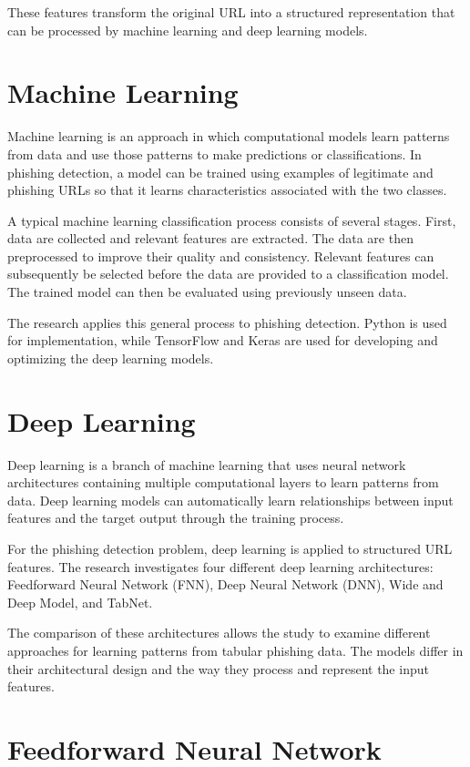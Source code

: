 \documentclass[12pt,a4paper]{report}
\begin{document}
These features transform the original URL into a structured
representation that can be processed by machine learning and deep
learning models.

\section{Machine Learning}

Machine learning is an approach in which computational models learn
patterns from data and use those patterns to make predictions or
classifications. In phishing detection, a model can be trained using
examples of legitimate and phishing URLs so that it learns
characteristics associated with the two classes.

A typical machine learning classification process consists of
several stages. First, data are collected and relevant features are
extracted. The data are then preprocessed to improve their quality
and consistency. Relevant features can subsequently be selected
before the data are provided to a classification model. The trained
model can then be evaluated using previously unseen data.

The research applies this general process to phishing detection.
Python is used for implementation, while TensorFlow and Keras are
used for developing and optimizing the deep learning models.

\section{Deep Learning}

Deep learning is a branch of machine learning that uses neural
network architectures containing multiple computational layers to
learn patterns from data. Deep learning models can automatically
learn relationships between input features and the target output
through the training process.

For the phishing detection problem, deep learning is applied to
structured URL features. The research investigates four different
deep learning architectures: Feedforward Neural Network (FNN), Deep
Neural Network (DNN), Wide and Deep Model, and TabNet.

The comparison of these architectures allows the study to examine
different approaches for learning patterns from tabular phishing
data. The models differ in their architectural design and the way
they process and represent the input features.

\section{Feedforward Neural Network}
\end{document}

